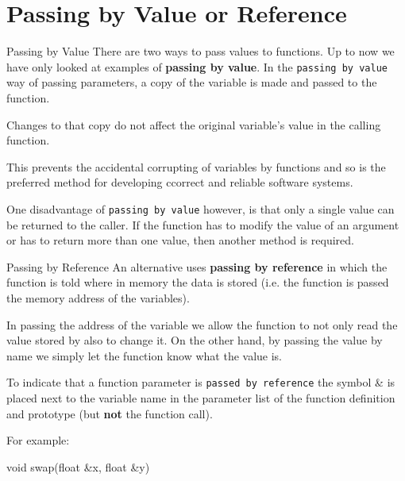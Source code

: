 \documentclass[../lecture4-functions.tex]{subfiles}
\begin{document}
\section{Passing by Value or Reference}


\begin{frame}[fragile]{Passing by Value}
    There are two ways to pass values to functions. Up to now we have only looked at examples of \textbf{passing by value}. In the \verb|passing by value| way of passing parameters, a copy of the variable is made and passed to the function. \newline

    Changes to that copy do not affect the original variable's value in the calling function. \newline

    This prevents the accidental corrupting of variables by functions and so is the preferred method for developing ccorrect and reliable software systems. \newline

    One disadvantage of \verb|passing by value| however, is that only a single value can be returned to the caller. If the function has to modify the value of an argument or has to return more than one value, then another method is required.
\end{frame}


\begin{frame}[fragile]{Passing by Reference}
    An alternative uses \textbf{passing by reference} in which the function is told where in memory the data is stored (i.e. the function is passed the memory address of the variables). \newline

    In passing the address of the variable we allow the function to not only read the value stored by also to change it. On the other hand, by passing the value by name we simply let the function know what the value is. \newline

    To indicate that a function parameter is \verb|passed by reference| the symbol \& is placed next to the variable name in the parameter list of the function definition and prototype (but \textbf{not} the function call). \newline

    For example:
    \begin{cppcode}[lastline = 1]
void swap(float &x, float &y)
    \end{cppcode}
\end{frame}
\end{document}
